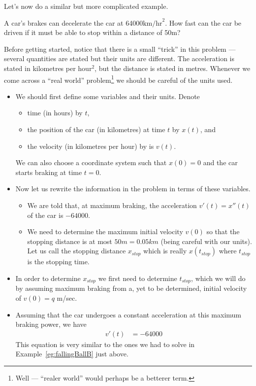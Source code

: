 Let's now do a similar but more complicated example.

\begin{eg}\label{eg:braking}
A car's brakes can decelerate the car at 64000$\textrm{km/hr}^2$.
How fast can the car be driven if it must be able to stop within a distance
of 50m?

\soln Before getting started, notice that there is a small ``trick'' in this problem
--- several quantities are stated but their units are different. The acceleration is
stated in kilometres per hour$^2$, but the distance is stated in metres. Whenever we come
across a ``real world'' problem\footnote{Well --- ``realer world'' would perhaps be a
betterer term.} we should be careful of the units used.

\begin{itemize}
 \item We should first define some variables and their units. Denote
\begin{itemize}
 \item time (in hours) by $t$,
 \item the position of the car (in kilometres) at time $t$ by $x(t)$, and
 \item the velocity (in kilometres per hour) by is $v(t)$.
\end{itemize}
  We can also choose a coordinate system such that $x(0)=0$ and the car starts
  braking at time $t=0$.

\item Now let us rewrite the information in the problem in terms of these variables.
\begin{itemize}
 \item We are told that, at maximum braking, the acceleration $v'(t)=x''(t)$ of the car
is $-64000$.
 \item We need to determine the maximum initial velocity $v(0)$ so that the stopping
distance is at most $50m = 0.05km$ (being careful with our units). Let us call the
stopping distance $x_{stop}$ which is really $x(t_{stop})$ where $t_{stop}$ is the
stopping time.
\end{itemize}

\item In order to determine $x_{stop}$ we first need to determine $t_{stop}$, which we
will do by assuming maximum braking from a, yet to be determined, initial velocity of
$v(0)=q$ m/sec.

\item Assuming that the car undergoes a constant acceleration at this maximum braking
power, we have
\begin{align*}
  v'(t) &= -64000
\end{align*}
This equation is very similar to the ones we had to solve in
Example~\ref{eg:fallingBallB} just above.


\end{itemize}
\end{eg}
